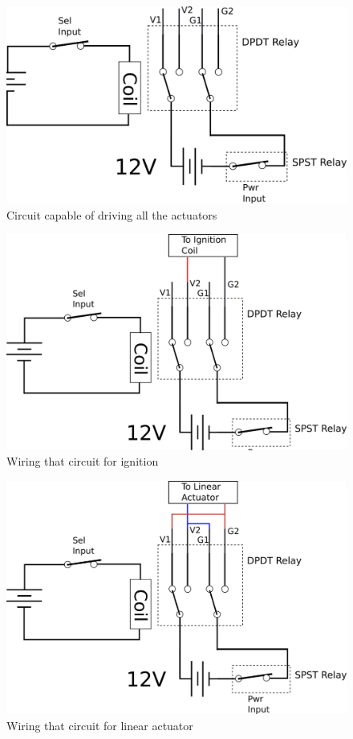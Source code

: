 \documentclass[11pt]{article}
\begin{document}
\begin{figure}[htbp]
\centering
\includegraphics[width=.9\linewidth]{./images/pcb_general.png}
\caption{\label{fig:orgc4748df}
Circuit capable of driving all the actuators}
\end{figure}

\begin{figure}[htbp]
\centering
\includegraphics[width=.9\linewidth]{./images/pcb_ignition.png}
\caption{\label{fig:org5d1220c}
Wiring that circuit for ignition}
\end{figure}

\begin{figure}[htbp]
\centering
\includegraphics[width=.9\linewidth]{./images/pcb_linear_act.png}
\caption{\label{fig:orgfdcfd88}
Wiring that circuit for linear actuator}
\end{figure}
\end{document}
